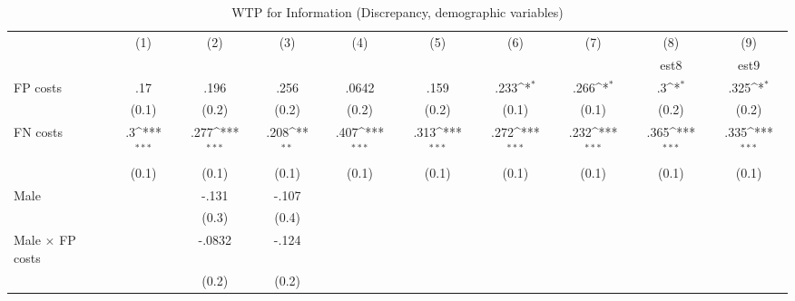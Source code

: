\begin{table}[htbp]\centering
\def\sym#1{\ifmmode^{#1}\else\(^{#1}\)\fi}
\caption{WTP for Information (Discrepancy, demographic variables)}
\begin{tabular}{l*{9}{c}}
\hline\hline
                &\multicolumn{1}{c}{(1)}&\multicolumn{1}{c}{(2)}&\multicolumn{1}{c}{(3)}&\multicolumn{1}{c}{(4)}&\multicolumn{1}{c}{(5)}&\multicolumn{1}{c}{(6)}&\multicolumn{1}{c}{(7)}&\multicolumn{1}{c}{(8)}&\multicolumn{1}{c}{(9)}\\
                &\multicolumn{1}{c}{}&\multicolumn{1}{c}{}&\multicolumn{1}{c}{}&\multicolumn{1}{c}{}&\multicolumn{1}{c}{}&\multicolumn{1}{c}{}&\multicolumn{1}{c}{}&\multicolumn{1}{c}{est8}&\multicolumn{1}{c}{est9}\\
\hline
FP costs        &      .17         &     .196         &     .256         &    .0642         &     .159         &     .233\sym{*}  &     .266\sym{*}  &       .3\sym{*}  &     .325\sym{*}  \\
                &    (0.1)         &    (0.2)         &    (0.2)         &    (0.2)         &    (0.2)         &    (0.1)         &    (0.1)         &    (0.2)         &    (0.2)         \\
FN costs        &       .3\sym{***}&     .277\sym{***}&     .208\sym{**} &     .407\sym{***}&     .313\sym{***}&     .272\sym{***}&     .232\sym{***}&     .365\sym{***}&     .335\sym{***}\\
                &    (0.1)         &    (0.1)         &    (0.1)         &    (0.1)         &    (0.1)         &    (0.1)         &    (0.1)         &    (0.1)         &    (0.1)         \\
Male            &                  &    -.131         &    -.107         &                  &                  &                  &                  &                  &                  \\
                &                  &    (0.3)         &    (0.4)         &                  &                  &                  &                  &                  &                  \\
Male $\times$ FP costs&                  &   -.0832         &    -.124         &                  &                  &                  &                  &                  &                  \\
                &                  &    (0.2)         &    (0.2)         &                  &                  &                  &                  &                  &                  \\

\end{tabular}
\end{table}

